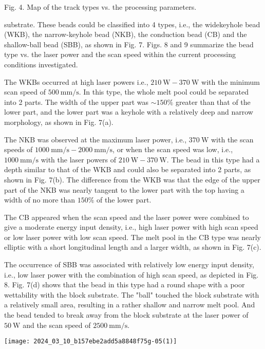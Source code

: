 \documentclass[10pt]{article}
\begin{document}
Fig. 4. Map of the track types vs. the processing parameters.

substrate. These beads could be classified into 4 types, i.e., the widekeyhole bead (WKB), the narrow-keyhole bead (NKB), the conduction bead (CB) and the shallow-ball bead (SBB), as shown in Fig. 7. Figs. 8 and 9 summarize the bead type vs. the laser power and the scan speed within the current processing conditions investigated.

The WKBs occurred at high laser powers i.e., $210 \mathrm{~W}-370 \mathrm{~W}$ with the minimum scan speed of $500 \mathrm{~mm} / \mathrm{s}$. In this type, the whole melt pool could be separated into 2 parts. The width of the upper part was $\sim 150 \%$ greater than that of the lower part, and the lower part was a keyhole with a relatively deep and narrow morphology, as shown in Fig. 7(a).

The NKB was observed at the maximum laser power, i.e., $370 \mathrm{~W}$ with the scan speeds of $1000 \mathrm{~mm} / \mathrm{s}-2000 \mathrm{~mm} / \mathrm{s}$, or when the scan speed was low, i.e., $1000 \mathrm{~mm} / \mathrm{s}$ with the laser powers of $210 \mathrm{~W}-370 \mathrm{~W}$. The bead in this type had a depth similar to that of the WKB and could also be separated into 2 parts, as shown in Fig. 7(b). The difference from the WKB was that the edge of the upper part of the NKB was nearly tangent to the lower part with the top having a width of no more than $150 \%$ of the lower part.

The CB appeared when the scan speed and the laser power were combined to give a moderate energy input density, i.e., high laser power with high scan speed or low laser power with low scan speed. The melt pool in the CB type was nearly elliptic with a short longitudinal length and a larger width, as shown in Fig. 7(c).

The occurrence of SBB was associated with relatively low energy input density, i.e., low laser power with the combination of high scan speed, as depicted in Fig. 8. Fig. 7(d) shows that the bead in this type had a round shape with a poor wettability with the block substrate. The "ball" touched the block substrate with a relatively small area, resulting in a rather shallow and narrow melt pool. And the bead tended to break away from the block substrate at the laser power of $50 \mathrm{~W}$ and the scan speed of $2500 \mathrm{~mm} / \mathrm{s}$.

\begin{center}
\texttt{[image: 2024\_03\_10\_b157ebe2add5a8848f75g-05(1)]}
\end{center}
\end{document}
